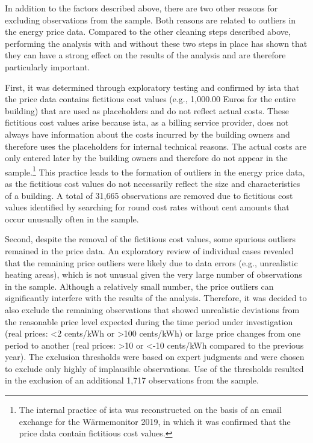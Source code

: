 \documentclass[12pt,twoside]{reedthesis}
\begin{document}
In addition to the factors described above, there are two other reasons for excluding observations from the sample. Both reasons are related to outliers in the energy price data. Compared to the other cleaning steps described above, performing the analysis with and without these two steps in place has shown that they can have a strong effect on the results of the analysis and are therefore particularly important.

First, it was determined through exploratory testing and confirmed by ista that the price data contains fictitious cost values (e.g., 1,000.00 Euros for the entire building) that are used as placeholders and do not reflect actual costs. These fictitious cost values arise because ista, as a billing service provider, does not always have information about the costs incurred by the building owners and therefore uses the placeholders for internal technical reasons. The actual costs are only entered later by the building owners and therefore do not appear in the sample.\footnote{The internal practice of ista was reconstructed on the basis of an email exchange for the Wärmemonitor 2019, in which it was confirmed that the price data contain fictitious cost values.} This practice leads to the formation of outliers in the energy price data, as the fictitious cost values do not necessarily reflect the size and characteristics of a building. A total of 31,665 observations are removed due to fictitious cost values identified by searching for round cost rates without cent amounts that occur unusually often in the sample.

Second, despite the removal of the fictitious cost values, some spurious outliers remained in the price data. An exploratory review of individual cases revealed that the remaining price outliers were likely due to data errors (e.g., unrealistic heating areas), which is not unusual given the very large number of observations in the sample. Although a relatively small number, the price outliers can significantly interfere with the results of the analysis. Therefore, it was decided to also exclude the remaining observations that showed unrealistic deviations from the reasonable price level expected during the time period under investigation (real prices: \textless2 cents/kWh or \textgreater100 cents/kWh) or large price changes from one period to another (real prices: \textgreater10 or \textless-10 cents/kWh compared to the previous year). The exclusion thresholds were based on expert judgments and were chosen to exclude only highly of implausible observations. Use of the thresholds resulted in the exclusion of an additional 1,717 observations from the sample.
\end{document}
